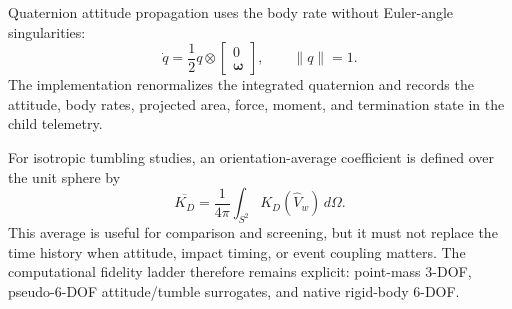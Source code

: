 Quaternion attitude propagation uses the body rate without Euler-angle
singularities:
\[
  \dot q=\frac{1}{2}q\otimes
  \begin{bmatrix}0\\\boldsymbol\omega\end{bmatrix},
  \qquad \lVert q\rVert=1.
\]
The implementation renormalizes the integrated quaternion and records the
attitude, body rates, projected area, force, moment, and termination state in
the child telemetry.

For isotropic tumbling studies, an orientation-average coefficient is defined
over the unit sphere by
\[
  \overline{K_D}
  =\frac{1}{4\pi}\int_{S^2}K_D(\hat V_w)\,d\Omega.
\]
This average is useful for comparison and screening, but it must not replace
the time history when attitude, impact timing, or event coupling matters.
The computational fidelity ladder therefore remains explicit: point-mass
3-DOF, pseudo-6-DOF attitude/tumble surrogates, and native rigid-body 6-DOF.
